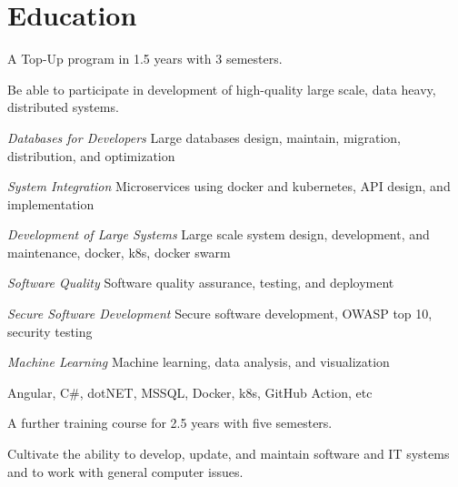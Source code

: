 \section{Education}
\begin{resume_list}
\item A Top-Up program in 1.5 years with 3 semesters. 
\item Be able to participate in development of high-quality large scale, data heavy, distributed systems.
\end{resume_list}

\begin{resume_list}
	\item {\it Databases for Developers} {\hfill Large databases design, maintain, migration, distribution, and optimization}
	\item {\it System Integration} {\hfill Microservices using docker and kubernetes, API design, and implementation}
	\item {\it Development of Large Systems} {\hfill Large scale system design, development, and maintenance, docker, k8s, docker swarm}
	\item {\it Software Quality} {\hfill Software quality assurance, testing, and deployment}
	\item {\it Secure Software Development} {\hfill Secure software development, OWASP top 10, security testing}
	\item {\it Machine Learning} {\hfill Machine learning, data analysis, and visualization}
\end{resume_list}

\begin{resume_list}
\item {Angular, C\#, dotNET, MSSQL, Docker, k8s, GitHub Action, etc }{}
\end{resume_list}

\begin{resume_list}
\item A further training course for 2.5 years with five semesters. 
\item Cultivate the ability to develop, update, and maintain software and IT systems and to work with general computer issues.
\end{resume_list}

